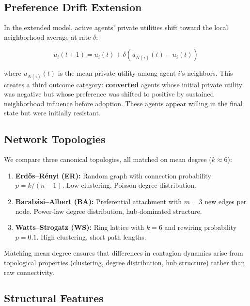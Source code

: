 \documentclass[11pt, a4paper]{article}
\begin{document}
\subsection{Preference Drift Extension}

In the extended model, active agents' private utilities shift toward the local neighborhood average at rate $\delta$:

\begin{equation}
    u_i(t+1) = u_i(t) + \delta \left( \bar{u}_{N(i)}(t) - u_i(t) \right)
    \label{eq:drift}
\end{equation}

\noindent where $\bar{u}_{N(i)}(t)$ is the mean private utility among agent $i$'s neighbors. This creates a third outcome category: \textbf{converted} agents whose initial private utility was negative but whose preference was shifted to positive by sustained neighborhood influence before adoption. These agents appear willing in the final state but were initially resistant.

\subsection{Network Topologies}

We compare three canonical topologies, all matched on mean degree ($\bar{k} \approx 6$):

\begin{enumerate}
    \item \textbf{Erd\H{o}s--R\'{e}nyi (ER):} Random graph with connection probability $p = \bar{k}/(n-1)$. Low clustering, Poisson degree distribution.
    \item \textbf{Barab\'{a}si--Albert (BA):} Preferential attachment with $m = 3$ new edges per node. Power-law degree distribution, hub-dominated structure.
    \item \textbf{Watts--Strogatz (WS):} Ring lattice with $k = 6$ and rewiring probability $p = 0.1$. High clustering, short path lengths.
\end{enumerate}

Matching mean degree ensures that differences in contagion dynamics arise from topological properties (clustering, degree distribution, hub structure) rather than raw connectivity.

\subsection{Structural Features}
\end{document}
